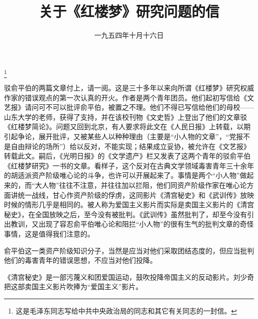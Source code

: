 
\title{关于《红楼梦》研究问题的信}
\date{一九五四年十月十六日}
\thanks{这是毛泽东同志写给中共中央政治局的同志和其它有关同志的一封信。}
\maketitle


驳俞平伯的两篇文章付上，请一阅。这是三十多年以来向所谓《红楼梦》研究权威作家的错误观点的第一次认真的开火。作者是两个青年团员。他们起初写信给《文艺报》请问可不可以批评俞平伯，被置之不理。他们不得已写信给他们的母校——山东大学的老师，获得了支持，并在该校刊物《文史哲》上登出了他们的文章驳《红楼梦简论》。问题又回到北京，有人要求将此文在《人民日报》上转载，以期引起争论，展开批评，又被某些人以种种理由（主要是“小人物的文章”，“党报不是自由辩论的场所”）给以反对，不能实现；结果成立妥协，被允许在《文艺报》转载此文。嗣后，《光明日报》的《文学遗产》栏又发表了这两个青年的驳俞平伯《红楼梦研究》一书的文章。看样子，这个反对在古典文学领域毒害青年三十余年的胡适派资产阶级唯心论的斗争，也许可以开展起来了。事情是两个“小人物”做起来的，而“大人物”往往不注意，并往往加以拦阻，他们同资产阶级作家在唯心论方面讲统一战线，甘心作资产阶级的俘虏，这同影片《清宫秘史》和《武训传》放映时候的情形几乎是相同的。被人称为爱国主义影片而实际是卖国主义影片的《清宫秘史》，在全国放映之后，至今没有被批判。《武训传》虽然批判了，却至今没有引出教训，又出现了容忍俞平伯唯心论和阻拦“小人物”的很有生气的批判文章的奇怪事情，这是值得我们注意的。

俞平伯这一类资产阶级知识分子，当然是应当对他们采取团结态度的，但应当批判他们的毒害青年的错误思想，不应当对他们投降。


\begin{maonote}
《清宫秘史》是一部污蔑义和团爱国运动，鼓吹投降帝国主义的反动影片。刘少奇把这部卖国主义影片吹捧为“爱国主义”影片。
\end{maonote}
